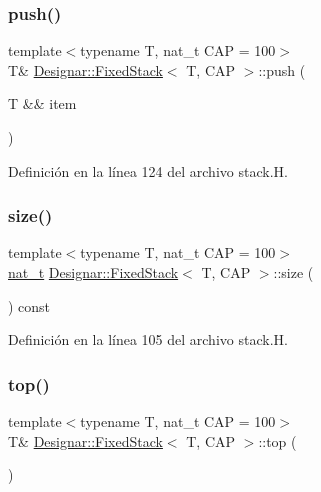 \subsubsection{\texorpdfstring{push()}{push()}\hspace{0.1cm}{\footnotesize\ttfamily [2/2]}}
{\footnotesize\ttfamily template$<$typename T, nat\+\_\+t C\+AP = 100$>$ \\
T\& \hyperlink{class_designar_1_1_fixed_stack}{Designar\+::\+Fixed\+Stack}$<$ T, C\+AP $>$\+::push (\begin{DoxyParamCaption}\item[{T \&\&}]{item }\end{DoxyParamCaption})\hspace{0.3cm}{\ttfamily [inline]}}



Definición en la línea 124 del archivo stack.\+H.

\mbox{\label{class_designar_1_1_fixed_stack_a89fc7e6df53ecefa9197a63aeb17e1d0}} 
\subsubsection{\texorpdfstring{size()}{size()}}
{\footnotesize\ttfamily template$<$typename T, nat\+\_\+t C\+AP = 100$>$ \\
\hyperlink{namespace_designar_aa72662848b9f4815e7bf31a7cf3e33d1}{nat\+\_\+t} \hyperlink{class_designar_1_1_fixed_stack}{Designar\+::\+Fixed\+Stack}$<$ T, C\+AP $>$\+::size (\begin{DoxyParamCaption}{ }\end{DoxyParamCaption}) const\hspace{0.3cm}{\ttfamily [inline]}}



Definición en la línea 105 del archivo stack.\+H.

\mbox{\label{class_designar_1_1_fixed_stack_ad9ee2070f73351b57f5cb7de74ab6aa7}} 
\subsubsection{\texorpdfstring{top()}{top()}\hspace{0.1cm}{\footnotesize\ttfamily [1/2]}}
{\footnotesize\ttfamily template$<$typename T, nat\+\_\+t C\+AP = 100$>$ \\
T\& \hyperlink{class_designar_1_1_fixed_stack}{Designar\+::\+Fixed\+Stack}$<$ T, C\+AP $>$\+::top (\begin{DoxyParamCaption}{ }\end{DoxyParamCaption})\hspace{0.3cm}{\ttfamily [inline]}}



